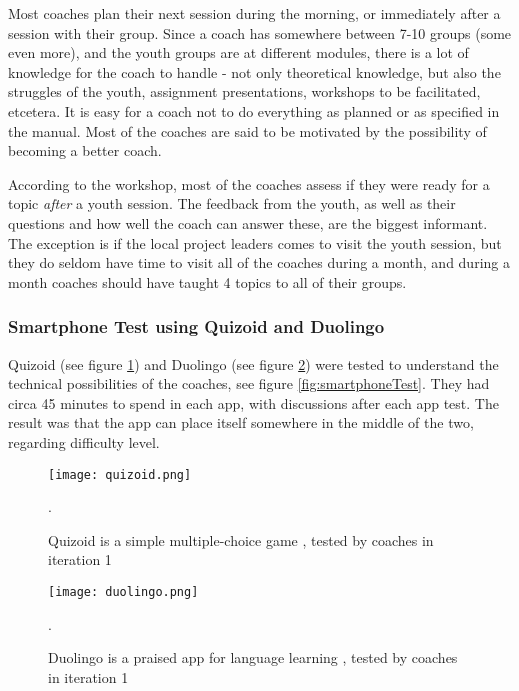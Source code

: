     Most coaches plan their next session during the morning, or immediately after a session with their group. Since a coach has somewhere between 7-10 groups (some even more), and the youth groups are at different modules, there is a lot of knowledge for the coach to handle - not only theoretical knowledge, but also the struggles of the youth, assignment presentations, workshops to be facilitated, etcetera. It is easy for a coach not to do everything as planned or as specified in the manual. Most of the coaches are said to be motivated by the possibility of becoming a better coach.

    According to the workshop, most of the coaches assess if they were ready for a topic \textit{after} a youth session. The feedback from the youth, as well as their questions and how well the coach can answer these, are the biggest informant. The exception is if the local project leaders comes to visit the youth session, but they do seldom have time to visit all of the coaches during a month, and during a month coaches should have taught 4 topics to all of their groups.

    \subsubsection{Smartphone Test using Quizoid and Duolingo}

    Quizoid (see figure \ref{fig:quizoid}) and Duolingo (see figure \ref{fig:duolingo}) were tested to understand the technical possibilities of the coaches, see figure \ref{fig:smartphoneTest}. They had circa 45 minutes to spend in each app, with discussions after each app test. The result was that the app can place itself somewhere in the middle of the two, regarding difficulty level.

    \begin{figure}[h]
        \centering
        \texttt{[image: quizoid.png]}
        \caption{Quizoid is a simple multiple-choice game \citep{quizoid}, tested by coaches in iteration 1}.
        \label{fig:quizoid}
    \end{figure}

    \begin{figure}[h]
        \centering
        \texttt{[image: duolingo.png]}
        \caption{Duolingo is a praised app for language learning \citep{duolingo}, tested by coaches in iteration 1}.
        \label{fig:duolingo}
    \end{figure}

